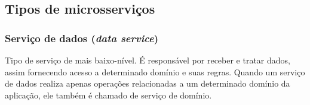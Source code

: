 

\subsection{Tipos de microsserviços}\label{fundamentacao-tipos-microsservicos}

\subsubsection{Serviço de dados (\emph{data service})}
Tipo de serviço de mais baixo-nível. É responsável por receber e tratar dados, assim fornecendo acesso a determinado domínio e suas regras. Quando um serviço de dados realiza apenas operações relacionadas a um determinado domínio da aplicação, ele também é chamado de serviço de domínio.

